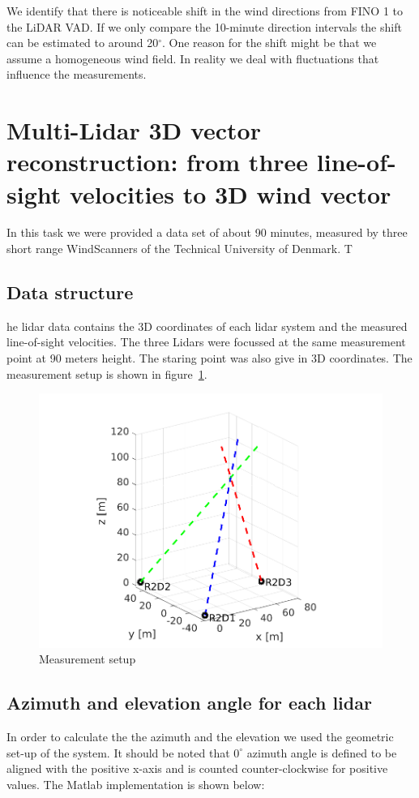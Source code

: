 \documentclass[10pt]{article}
\begin{document}
We identify that there is noticeable shift in the wind directions from FINO 1 to the LiDAR VAD. If we only compare the 10-minute direction intervals the shift can be estimated to around 20$^\circ$. One reason for the shift might be that we assume a homogeneous wind field. In reality we deal with fluctuations that influence the measurements. 

\section{Multi-Lidar 3D vector reconstruction: from three line-of-sight velocities to 3D wind vector}
In this task we were provided a data set of about 90 minutes, measured by three short range WindScanners of the Technical University of Denmark. T
\subsection{Data structure}
he lidar data contains the 3D coordinates of each lidar system and the measured line-of-sight velocities. The three Lidars were focussed at the same measurement point at 90 meters height. The staring point was also give in 3D coordinates.
 The measurement setup is shown in figure~\ref{fig:measurementsetup}.

\begin{figure}[H]
\includegraphics[width=1\linewidth]{../Exercises_and_Tasks/lidar.png}
\caption{Measurement setup}
\label{fig:measurementsetup}
\end{figure}
\subsection{Azimuth and elevation angle for each lidar}
In order to calculate the the azimuth and the elevation we used the geometric set-up of the system.
It should be noted that $0^\circ$ azimuth angle is defined to be aligned with the positive x-axis and is counted counter-clockwise for positive values. 
The Matlab implementation is shown below:\\
\end{document}
